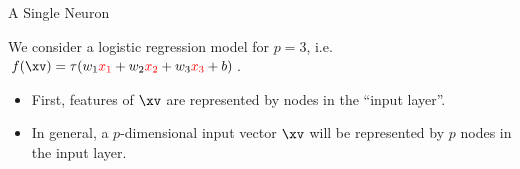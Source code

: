 \begin{frame} {A Single Neuron}

We consider a logistic regression model for $p = 3$, i.e. $f(\xv) = \tau(w_1\textcolor{red}{x_1} + w_2\textcolor{red}{x_2} + w_3\textcolor{red}{x_3} + b)$.

  \begin{itemize}
    \item First, features of $\xv$ are represented by nodes in the \enquote{input layer}.
    \begin{figure}
    \centering
  \end{figure}
    \item In general, a $p$-dimensional input vector $\xv$ will be represented by $p$ nodes in the input layer.
  \end{itemize}
\end{frame}

